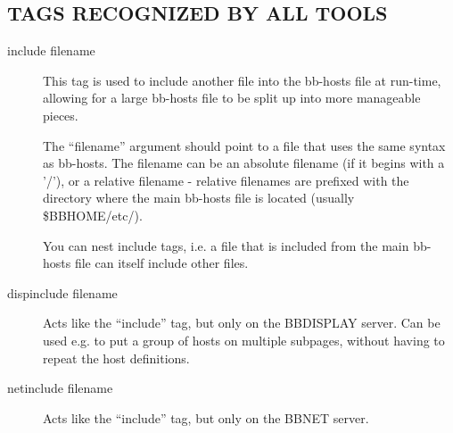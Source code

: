  


 
\subsection{TAGS RECOGNIZED BY ALL TOOLS}


 \begin{description}
\item[include filename] This tag is used to include another file into
  the bb-hosts file at run-time, allowing for a large bb-hosts file to
  be split up into more manageable pieces. 


  The ``filename'' argument should point to a file that uses the same
  syntax as bb-hosts. The filename can be an absolute filename (if it
  begins with a '/'), or a relative filename - relative filenames are
  prefixed with the directory where the main bb-hosts file is located
  (usually \$BBHOME/etc/). 



  You can nest include tags, i.e. a file that is included from the
  main bb-hosts file can itself include other files. 



 

\item[dispinclude filename] Acts like the ``include'' tag, but only on
  the BBDISPLAY server. Can be used e.g. to put a group of hosts on
  multiple subpages, without having to repeat the host definitions. 


 

\item[netinclude filename] Acts like the ``include'' tag, but only on the BBNET server. 

 


 


\end{description}

